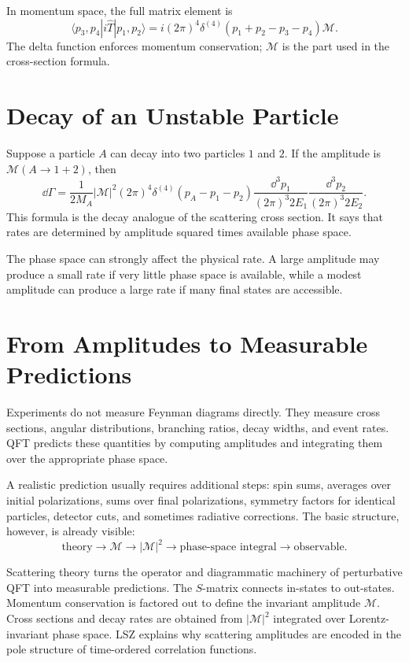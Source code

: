In momentum space, the full matrix element is
\[
    \langle p_3,p_4|i\hat T|p_1,p_2\rangle
    = i(2\pi)^4\delta^{(4)}(p_1+p_2-p_3-p_4)\mathcal{M}.
\]
The delta function enforces momentum conservation; \(\mathcal{M}\) is the part
used in the cross-section formula.

\section{Decay of an Unstable Particle}

Suppose a particle \(A\) can decay into two particles \(1\) and \(2\). If the
amplitude is \(\mathcal{M}(A\to1+2)\), then
\[
    \dd\Gamma
    = \frac{1}{2M_A}|\mathcal{M}|^2
      (2\pi)^4\delta^{(4)}(p_A-p_1-p_2)
      \frac{\dd^3p_1}{(2\pi)^3 2E_1}
      \frac{\dd^3p_2}{(2\pi)^3 2E_2}.
\]
This formula is the decay analogue of the scattering cross section. It says that
rates are determined by amplitude squared times available phase space.

The phase space can strongly affect the physical rate. A large amplitude may
produce a small rate if very little phase space is available, while a modest
amplitude can produce a large rate if many final states are accessible.

\section{From Amplitudes to Measurable Predictions}

Experiments do not measure Feynman diagrams directly. They measure cross
sections, angular distributions, branching ratios, decay widths, and event
rates. QFT predicts these quantities by computing amplitudes and integrating them
over the appropriate phase space.

A realistic prediction usually requires additional steps: spin sums, averages
over initial polarizations, sums over final polarizations, symmetry factors for
identical particles, detector cuts, and sometimes radiative corrections. The
basic structure, however, is already visible:
\[
    \text{theory} \longrightarrow \mathcal{M}
    \longrightarrow |\mathcal{M}|^2
    \longrightarrow \text{phase-space integral}
    \longrightarrow \text{observable}.
\]

\begin{summarybox}
Scattering theory turns the operator and diagrammatic machinery of perturbative
QFT into measurable predictions. The \(S\)-matrix connects in-states to
out-states. Momentum conservation is factored out to define the invariant
amplitude \(\mathcal{M}\). Cross sections and decay rates are obtained from
\(|\mathcal{M}|^2\) integrated over Lorentz-invariant phase space. LSZ explains
why scattering amplitudes are encoded in the pole structure of time-ordered
correlation functions.
\end{summarybox}

